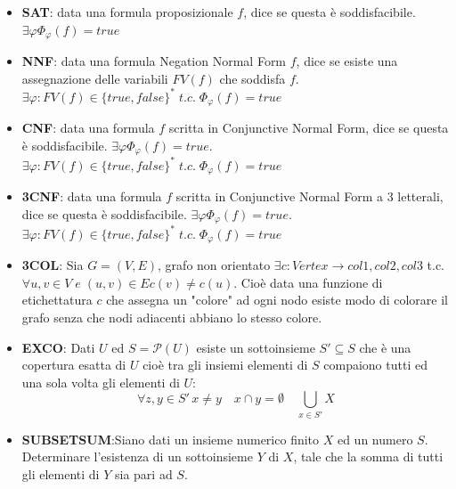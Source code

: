\documentclass[a4paper]{article}
\begin{document}
\begin{itemize}
	\item \textbf{SAT}: data una formula proposizionale $f$, dice se questa è soddisfacibile. $\exists \varphi \Phi _ {\varphi}(f) = true $
	\item \textbf{NNF}: data una formula Negation Normal Form $f$, dice se esiste una assegnazione delle variabili $FV(f)$ che soddisfa $f$.\\$\exists \varphi:FV(f) \in \{true,false\}^* \; t.c. \; \Phi _ {\varphi}(f) = true $
	\item \textbf{CNF}: data una formula $f$ scritta in Conjunctive Normal Form, dice se questa è soddisfacibile. $\exists \varphi \Phi _ {\varphi}(f) = true $.\\
$\exists \varphi:FV(f) \in \{true,false\}^* \; t.c. \; \Phi _ {\varphi}(f) = true $
	\item \textbf{3CNF}: data una formula $f$ scritta in Conjunctive Normal Form a 3 letterali, dice se questa è soddisfacibile. $\exists \varphi \Phi _ {\varphi}(f) = true $.\\
$\exists \varphi:FV(f) \in \{true,false\}^* \; t.c. \; \Phi _ {\varphi}(f) = true $
	\item \textbf{3COL}: Sia $G = (V,E)$, grafo non orientato $\exists c : Vertex \rightarrow {col1,col2,col3}$ t.c. $\forall u,v \in V \; e \; (u,v) \in E c(v) \neq c(u)$.
		Cioè data una funzione di etichettatura $c$ che assegna un "colore" ad ogni nodo esiste modo di colorare il grafo senza che nodi adiacenti abbiano lo stesso colore.
	\item \textbf{EXCO}: Dati $U$ ed $S=\mathcal{P}(U)$ esiste un sottoinsieme $S' \subseteq S$ che è una copertura esatta di $U$ cioè tra gli insiemi elementi di $S$ compaiono tutti ed una sola volta gli elementi di $U$:
		$$\forall z,y \in S'\, x \neq y \quad x \cap y = \emptyset \quad \bigcup_{x \in S'}X $$
	\item \textbf{SUBSETSUM}:Siano dati un insieme numerico finito $X$ ed un numero $S$. Determinare l’esistenza di un sottoinsieme $Y$ di $X$, tale che la somma di tutti gli elementi di $Y$ sia pari ad $S$. 
\end{itemize}
\end{document}
